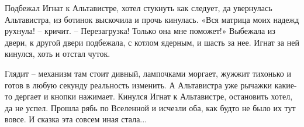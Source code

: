 \documentclass[ebook,oneside,final,openright]{memoir}
\begin{document}
\par
Подбежал Игнат к Альтавистре, хотел стукнуть как следует, да увернулась Альтавистра, из ботинок выскочила и прочь кинулась. «Вся матрица моих надежд рухнула! – кричит. – Перезагрузка! Только она мне поможет!» Выбежала из двери, к другой двери подбежала, с котлом ядерным, и шасть за нее. Игнат за ней кинулся, хоть и отстал чуток.\par
\par
Глядит – механизм там стоит дивный, лампочками моргает, жужжит тихонько и готов в любую секунду реальность изменить. А Альтавистра уже рычажки какие-то дергает и кнопки нажимает. Кинулся Игнат к Альтавистре, остановить хотел, да не успел. Прошла рябь по Вселенной и исчезли оба, как будто не было их тут вовсе. И сказка эта совсем иная стала...\par
\end{document}
